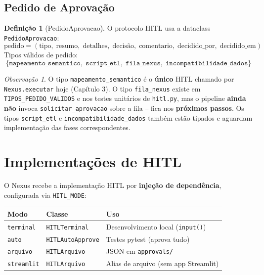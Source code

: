\documentclass[a4paper, 12pt]{report}
\theoremstyle{definition}
\newtheorem{definicao}{Defini\c{c}\~ao}[chapter]
\theoremstyle{remark}
\newtheorem{observacao}{Observa\c{c}\~ao}[chapter]
\begin{document}
\subsection{Pedido de Aprova\c{c}\~ao}

\begin{definicao}[PedidoAprovacao]
  O protocolo HITL usa a dataclass \texttt{PedidoAprovacao}:
  \[
    \text{pedido} = (\text{tipo},\; \text{resumo},\; \text{detalhes},\;
    \text{decis\~ao},\; \text{comentario},\; \text{decidido\_por},\;
    \text{decidido\_em})
  \]
  Tipos v\'alidos de pedido:
  \[
    \{\texttt{mapeamento\_semantico},\;
      \texttt{script\_etl},\;
      \texttt{fila\_nexus},\;
      \texttt{incompatibilidade\_dados}\}
  \]
\end{definicao}

\begin{observacao}
  O tipo \texttt{mapeamento\_semantico} \'e o \textbf{\'unico} HITL
  chamado por \texttt{Nexus.executar} hoje (Cap\'itulo 3).
  O tipo \texttt{fila\_nexus} existe em \texttt{TIPOS\_PEDIDO\_VALIDOS}
  e nos testes unit\'arios de \texttt{hitl.py}, mas o pipeline
  \textbf{ainda n\~ao} invoca \texttt{solicitar\_aprovacao} sobre a
  fila -- fica nos \textbf{pr\'oximos passos}. Os tipos
  \texttt{script\_etl} e \texttt{incompatibilidade\_dados} tamb\'em
  est\~ao tipados e aguardam implementa\c{c}\~ao das fases
  correspondentes.
\end{observacao}


\section{Implementa\c{c}\~oes de HITL}

O Nexus recebe a implementa\c{c}\~ao HITL por \textbf{inje\c{c}\~ao de
depend\^encia}, configurada via \texttt{HITL\_MODE}:

\begin{center}
\begin{tabular}{llp{5cm}}
  \toprule
  \textbf{Modo} & \textbf{Classe} & \textbf{Uso} \\
  \midrule
  \texttt{terminal} & \texttt{HITLTerminal} & Desenvolvimento local (\texttt{input()}) \\
  \texttt{auto} & \texttt{HITLAutoApprove} & Testes pytest (aprova tudo) \\
  \texttt{arquivo} & \texttt{HITLArquivo} & JSON em \texttt{approvals/} \\
  \texttt{streamlit} & \texttt{HITLArquivo} & Alias de arquivo (sem app Streamlit) \\
  \bottomrule
\end{tabular}
\end{center}
\end{document}

